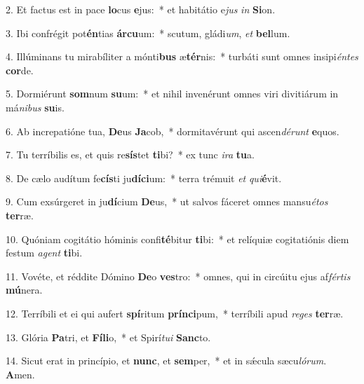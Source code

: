 2. Et factus est in pace \textbf{lo}cus \textbf{e}jus:~*  et habitátio e\textit{jus} \textit{in} \textbf{Si}on.\

3. Ibi confrégit pot\textbf{én}tias \textbf{ár}\textbf{cu}um:~*  scutum, gládi\textit{um}, \textit{et} \textbf{bel}lum.\

4. Illúminans tu mirabíliter a mónti\textbf{bus} æ\textbf{tér}nis:~*  turbáti sunt omnes insipi\textit{én}\textit{tes} \textbf{cor}de.\

5. Dormiérunt \textbf{som}num \textbf{su}um:~*  et nihil invenérunt omnes viri divitiárum in má\textit{ni}\textit{bus} \textbf{su}is.\

6. Ab increpatióne tua, \textbf{De}us \textbf{Ja}cob,~*  dormitavérunt qui ascen\textit{dé}\textit{runt} \textbf{e}quos.\

7. Tu terríbilis es, et quis re\textbf{sís}tet \textbf{ti}bi?~*  ex tunc \textit{i}\textit{ra} \textbf{tu}a.\

8. De cælo audítum fe\textbf{cís}ti ju\textbf{dí}\textbf{ci}um:~*  terra trémuit \textit{et} \textit{qui}\textbf{é}vit.\

9. Cum exsúrgeret in ju\textbf{dí}cium \textbf{De}us,~*  ut salvos fáceret omnes mansu\textit{é}\textit{tos} \textbf{ter}ræ.\

10. Quóniam cogitátio hóminis confi\textbf{té}bitur \textbf{ti}bi:~*  et relíquiæ cogitatiónis diem festum \textit{a}\textit{gent} \textbf{ti}bi.\

11. Vovéte, et réddite Dómino \textbf{De}o \textbf{ves}tro:~*  omnes, qui in circúitu ejus af\textit{fér}\textit{tis} \textbf{mú}nera.\

12. Terríbili et ei qui aufert \textbf{spí}ritum \textbf{prín}\textbf{ci}pum,~*  terríbili apud \textit{re}\textit{ges} \textbf{ter}ræ.\

13. Glória \textbf{Pa}tri, et \textbf{Fí}\textbf{li}o,~*  et Spirí\textit{tu}\textit{i} \textbf{Sanc}to.\

14. Sicut erat in princípio, et \textbf{nunc}, et \textbf{sem}per,~*  et in sǽcula sæcu\textit{ló}\textit{rum}. \textbf{A}men.\

